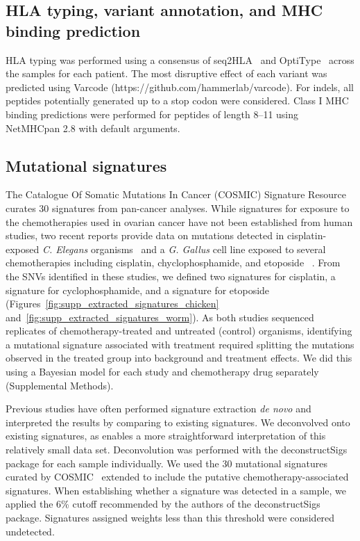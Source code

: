 \subsection*{HLA typing, variant annotation, and MHC binding prediction}
\begin{sloppypar}
HLA typing was performed using a consensus of seq2HLA~\cite{Boegel_2012} and OptiType~\cite{Szolek_2014} across the samples for each patient. The most disruptive effect of each variant was predicted using Varcode (https://github.com/hammerlab/varcode). For indels, all peptides potentially generated up to a stop codon were considered. Class I MHC binding predictions were performed for peptides of length 8--11 using NetMHCpan 2.8\cite{Lundegaard_2008} with default arguments.
\end{sloppypar}

\subsection*{Mutational signatures}
The Catalogue Of Somatic Mutations In Cancer (COSMIC) Signature Resource curates 30 signatures from pan-cancer analyses. While signatures for exposure to the chemotherapies used in ovarian cancer have not been established from human studies, two recent reports provide data on mutations detected in cisplatin-exposed \textit{C. Elegans} organisms~\cite{Meier_2014} and a \textit{G. Gallus} cell line exposed to several chemotherapies including cisplatin, chyclophosphamide, and etoposide ~\cite{Szikriszt_2016}. From the SNVs identified in these studies, we defined two signatures for cisplatin, a signature for cyclophosphamide, and a signature for etoposide (Figures~\ref{fig:supp_extracted_signatures_chicken} and~\ref{fig:supp_extracted_signatures_worm}). As both studies sequenced replicates of chemotherapy-treated and untreated (control) organisms, identifying a mutational signature associated with treatment required splitting the mutations observed in the treated group into background and treatment effects. We did this using a Bayesian model for each study and chemotherapy drug separately (Supplemental Methods).

Previous studies have often performed signature extraction \textit{de novo} and interpreted the results by comparing to existing signatures. We deconvolved onto existing signatures, as enables a more straightforward interpretation of this relatively small data set. Deconvolution was performed with the deconstructSigs~\cite{Rosenthal_2016} package for each sample individually. We used the 30 mutational signatures curated by COSMIC~\cite{364242} extended to include the putative chemotherapy-associated signatures. When establishing whether a signature was detected in a sample, we applied the 6\% cutoff recommended by the authors of the deconstructSigs package. Signatures assigned weights less than this threshold were considered undetected.

